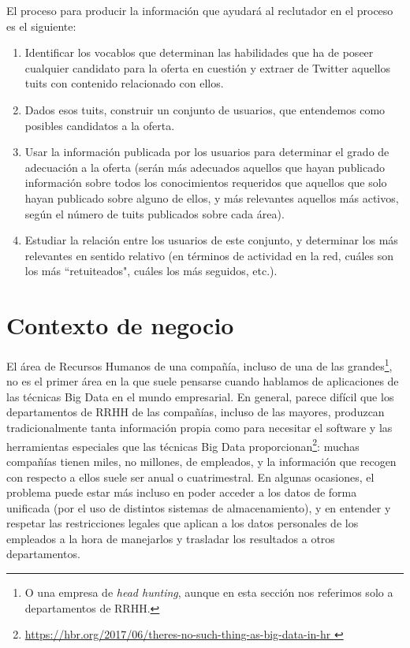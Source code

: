 El proceso para producir la información que ayudará al reclutador en el proceso es el siguiente:
\begin{enumerate}
\item Identificar los vocablos que determinan las habilidades que ha de poseer cualquier candidato
para la oferta en cuestión y extraer de Twitter aquellos tuits con contenido relacionado con ellos.
\item Dados esos tuits, construir un conjunto de usuarios, que entendemos como posibles candidatos 
a la oferta.
\item Usar la información publicada por los usuarios para determinar el grado de adecuación a la oferta
(serán más adecuados aquellos que hayan publicado información sobre todos los conocimientos requeridos que 
aquellos que solo hayan publicado sobre alguno de ellos, y más relevantes aquellos más activos, según el
número de tuits publicados sobre cada área).
\item Estudiar la relación entre los usuarios de este conjunto, y determinar los más relevantes en sentido
relativo (en términos de actividad en la red, cuáles son los más ``retuiteados", cuáles los más seguidos, etc.).
\end{enumerate}



\section{Contexto de negocio}
El área de Recursos Humanos de una compañía, incluso de una de las grandes\footnote{O
una empresa de {\em head hunting}, aunque en esta sección nos referimos solo a departamentos
de RRHH.}, no es el primer área 
en la que suele pensarse cuando hablamos de aplicaciones de las técnicas Big Data en el mundo
empresarial. En general,
parece difícil que los departamentos de RRHH de las compañías,  incluso de las mayores, produzcan
tradicionalmente tanta información propia como para necesitar el software y las herramientas especiales
que las técnicas Big Data proporcionan\footnote{\url{https://hbr.org/2017/06/theres-no-such-thing-as-big-data-in-hr }}:
muchas compañías tienen miles, no millones, de empleados, y la información que recogen con respecto a ellos
suele ser anual o cuatrimestral. En algunas ocasiones, el problema puede estar más incluso en
poder acceder a los datos de forma unificada (por el uso de distintos sistemas de almacenamiento),
y en entender y respetar las restricciones legales que aplican a los datos personales de los empleados
a la hora de manejarlos y trasladar los resultados a otros departamentos.

